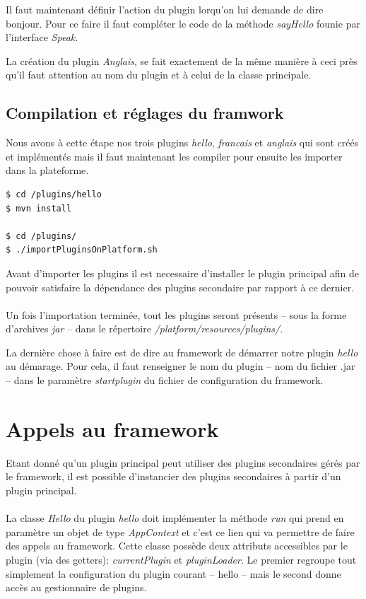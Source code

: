 \documentclass[12pt,a4paper]{article}
\begin{document}
Il faut maintenant définir l'action du plugin lorqu'on lui demande de dire bonjour. 
Pour ce faire il faut compléter le code de la méthode \emph{sayHello} founie par 
l'interface \emph{Speak}.

\lstset{language=java,caption=/plugins/francais/src/main/java/com/francais/Francais.java}


La création du plugin \emph{Anglais}, se fait exactement de la même manière à ceci 
près qu'il faut attention au nom du plugin et à celui de la classe principale.

\subsection{Compilation et réglages du framwork}
Nous avons à cette étape nos trois plugins \emph{hello}, \emph{francais} et 
\emph{anglais} qui sont créés et implémentés mais il faut maintenant les compiler 
pour ensuite les importer dans la plateforme.

\begin{lstlisting}[language=bash,caption=Compilation des plugins]
$ cd /plugins/hello
$ mvn install

$ cd /plugins/
$ ./importPluginsOnPlatform.sh
\end{lstlisting}

Avant d'importer les plugins il est necessaire d'installer le plugin principal 
afin de pouvoir satisfaire la dépendance des plugins secondaire par rapport 
à ce dernier.
\\\\
Un fois l'importation terminée, tout les plugins seront présents -- sous la forme 
d'archives \emph{jar} -- dans le répertoire \emph{/platform/resources/plugins/}.

La dernière chose à faire est de dire au framework de démarrer notre plugin 
\emph{hello} au démarage. Pour cela, il faut renseigner le nom du plugin 
-- nom du fichier .jar -- dans le paramètre \emph{startplugin} du fichier de 
configuration du framework.

\section{Appels au framework}
Etant donné qu'un plugin principal peut utiliser des plugins secondaires gérés 
par le framework, il est possible d'instancier des plugins secondaires à 
partir d'un plugin principal.
\\\\
La classe \emph{Hello} du plugin \emph{hello} doit implémenter la méthode 
\emph{run} qui prend en paramètre un objet de type \emph{AppContext} et c'est 
ce lien qui va permettre de faire des appels au framework. 
Cette classe possède deux attributs accessibles par le plugin (via des getters):
\emph{currentPlugin} et \emph{pluginLoader}. Le premier regroupe tout simplement 
la configuration du plugin courant -- hello -- mais le second donne accès au 
gestionnaire de plugins.
\end{document}
